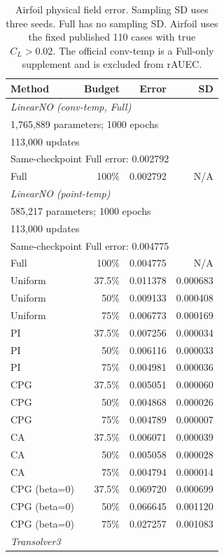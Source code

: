 \begin{table}[t]
\centering\small
\caption{Airfoil physical field error. Sampling SD uses three seeds. Full has no sampling SD. Airfoil uses the fixed published 110 cases with true $C_L>0.02$. The official conv-temp is a Full-only supplement and is excluded from rAUEC.}
\setlength{\tabcolsep}{6pt}
\begin{tabular}{lrrr}
\toprule
Method & Budget & Error & SD \\
\midrule
\multicolumn{4}{l}{\textit{LinearNO (conv-temp, Full)}} \\
\multicolumn{4}{l}{1,765,889 parameters; 1000 epochs} \\
\multicolumn{4}{l}{113,000 updates} \\
\multicolumn{4}{l}{Same-checkpoint Full error: 0.002792} \\
Full & 100\% & 0.002792 & N/A \\
\midrule
\multicolumn{4}{l}{\textit{LinearNO (point-temp)}} \\
\multicolumn{4}{l}{585,217 parameters; 1000 epochs} \\
\multicolumn{4}{l}{113,000 updates} \\
\multicolumn{4}{l}{Same-checkpoint Full error: 0.004775} \\
Full & 100\% & 0.004775 & N/A \\
Uniform & 37.5\% & 0.011378 & 0.000683 \\
Uniform & 50\% & 0.009133 & 0.000408 \\
Uniform & 75\% & 0.006773 & 0.000169 \\
PI & 37.5\% & 0.007256 & 0.000034 \\
PI & 50\% & 0.006116 & 0.000033 \\
PI & 75\% & 0.004981 & 0.000036 \\
CPG & 37.5\% & 0.005051 & 0.000060 \\
CPG & 50\% & 0.004868 & 0.000026 \\
CPG & 75\% & 0.004789 & 0.000007 \\
CA & 37.5\% & 0.006071 & 0.000039 \\
CA & 50\% & 0.005058 & 0.000028 \\
CA & 75\% & 0.004794 & 0.000014 \\
CPG (beta=0) & 37.5\% & 0.069720 & 0.000699 \\
CPG (beta=0) & 50\% & 0.066645 & 0.001120 \\
CPG (beta=0) & 75\% & 0.027257 & 0.001083 \\
\midrule
\multicolumn{4}{l}{\textit{Transolver3}} \\

\end{tabular}
\end{table}
